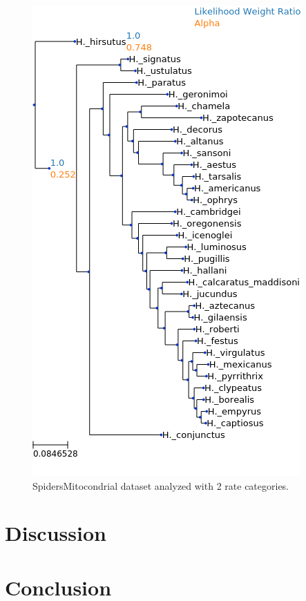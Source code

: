 \documentclass{article}
\begin{document}
\begin{figure}
  \begin{center}
    \includegraphics[width=.75\linewidth]{figs/spiders/2rate.png}
    \caption{SpidersMitocondrial dataset analyzed with 2 rate categories.}
    \label{fig:spiders2rate}
  \end{center}
\end{figure}

\section{Discussion}

\section{Conclusion}



\end{document}
